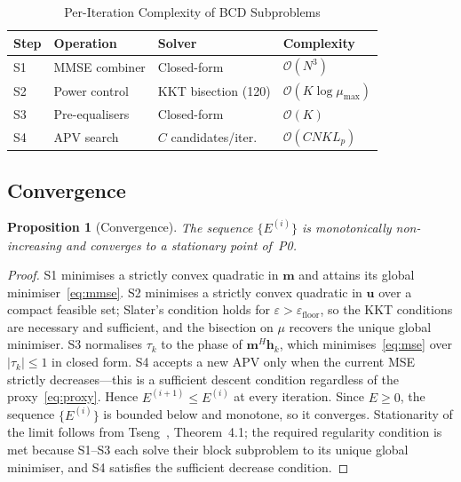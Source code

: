 \documentclass[journal,letterpaper,10pt,twocolumn]{IEEEtran}
\newtheorem{proposition}{Proposition}
\begin{document}
\begin{table}[!t]
  \caption{Per-Iteration Complexity of BCD Subproblems}
  \label{tab:complexity}
  \centering
  \small
  \begin{tabular}{@{}llll@{}}
    \toprule
    Step & Operation & Solver & Complexity\\
    \midrule
    S1 & MMSE combiner   & Closed-form           & $\mathcal{O}(N^{3})$\\
    S2 & Power control   & KKT bisection (120)   & $\mathcal{O}(K\log\mu_{\max})$\\
    S3 & Pre-equalisers  & Closed-form           & $\mathcal{O}(K)$\\
    S4 & APV search      & $C$ candidates/iter.  & $\mathcal{O}(CNK L_{p})$\\
    \bottomrule
  \end{tabular}
\end{table}

\subsection{Convergence}

\begin{proposition}[Convergence]
The sequence $\{E^{(i)}\}$ is monotonically non-increasing and converges
to a stationary point of~P0.
\end{proposition}
\begin{proof}
S1 minimises a strictly convex quadratic in $\mathbf{m}$ and attains its
global minimiser~\eqref{eq:mmse}. S2 minimises a strictly convex
quadratic in $\mathbf{u}$ over a compact feasible set; Slater's condition
holds for $\varepsilon\!>\!\varepsilon_{\text{floor}}$, so the KKT
conditions are necessary and sufficient, and the bisection on $\mu$
recovers the unique global minimiser. S3 normalises $\tau_{k}$ to the
phase of $\mathbf{m}^{H}\mathbf{h}_{k}$, which minimises~\eqref{eq:mse}
over $|\tau_{k}|\!\leq\!1$ in closed form. S4 accepts a new APV only
when the current MSE strictly decreases---this is a sufficient descent
condition regardless of the proxy~\eqref{eq:proxy}. Hence
$E^{(i+1)}\!\leq\!E^{(i)}$ at every iteration. Since $E\!\geq\!0$, the
sequence $\{E^{(i)}\}$ is bounded below and monotone, so it converges.
Stationarity of the limit follows from Tseng~\cite{Tseng2001},
Theorem~4.1; the required regularity condition is met because S1--S3
each solve their block subproblem to its unique global minimiser, and S4
satisfies the sufficient decrease condition.
\end{proof}
\end{document}
